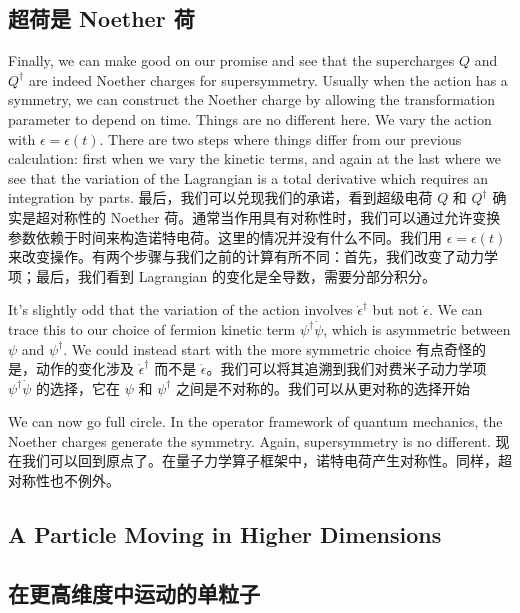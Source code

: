 \documentclass{ctexart}
\begin{document}
\begin{paracol}{2}
\subsection*{超荷是 Noether 荷}
\switchcolumn*

Finally, we can make good on our promise and see that the supercharges $Q$ and $Q^{\dagger}$ are indeed Noether charges for supersymmetry. Usually when the action has a symmetry, we can construct the Noether charge by allowing the transformation parameter to depend on time. Things are no different here. We vary the action with $\epsilon = \epsilon(t)$. There are two steps where things differ from our previous calculation: first when we vary the kinetic terms, and again at the last where we see that the variation of the Lagrangian is a total derivative which requires an integration by parts.
\switchcolumn
最后，我们可以兑现我们的承诺，看到超级电荷 $Q$ 和 $Q^{\dagger}$ 确实是超对称性的 Noether 荷。通常当作用具有对称性时，我们可以通过允许变换参数依赖于时间来构造诺特电荷。这里的情况并没有什么不同。我们用 $\epsilon = \epsilon(t)$ 来改变操作。有两个步骤与我们之前的计算有所不同：首先，我们改变了动力学项；最后，我们看到 Lagrangian 的变化是全导数，需要分部分积分。
\switchcolumn*

It's slightly odd that the variation of the action involves $\dot{\epsilon}^{\dagger}$ but not $\dot{\epsilon}$. We can trace this to our choice of fermion kinetic term $\psi^{\dagger} \dot{\psi}$, which is asymmetric between $\psi$ and $\psi^{\dagger}$. We could instead start with the more symmetric choice
\switchcolumn
有点奇怪的是，动作的变化涉及 $\dot{\epsilon}^{\dagger}$ 而不是 $\dot{\epsilon}$。我们可以将其追溯到我们对费米子动力学项 $\psi^{\dagger} \dot{\psi}$ 的选择，它在 $\psi$ 和 $\psi^{\dagger}$ 之间是不对称的。我们可以从更对称的选择开始
\switchcolumn*

We can now go full circle. In the operator framework of quantum mechanics, the Noether charges generate the symmetry. Again, supersymmetry is no different.
\switchcolumn
现在我们可以回到原点了。在量子力学算子框架中，诺特电荷产生对称性。同样，超对称性也不例外。
\switchcolumn*

\subsection{A Particle Moving in Higher Dimensions}
\switchcolumn
\subsection*{在更高维度中运动的单粒子}
\switchcolumn*


\end{paracol}
\end{document}
